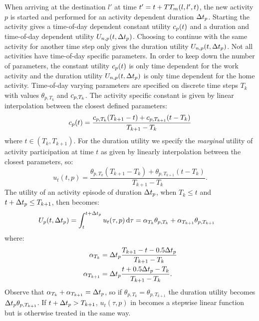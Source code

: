 When arriving at the destination $l'$ at time $t' = t+TT_m(l,l',t)$, the new activity $p$ is started and performed for an activity dependent duration $\Delta t_p$. Starting the activity gives a time-of-day dependent constant utility $c_p(t)$ and a duration and time-of-day dependent utility $U_{n,p}(t,\Delta t_p)$. Choosing to continue with the same activity for another time step only gives the duration utility $U_{n,p}(t,\Delta t_p)$. Not all activities have time-of-day specific parameters. In order to keep down the number of parameters, the constant utility $c_p(t)$ is only time dependent for the work activity and the duration utility $U_{n,p}(t,\Delta t_p)$ is only time dependent for the home activity. Time-of-day varying parameters are specified on discrete time steps $T_k$ with values $\theta_{p,T_k}$ and $c_{p,T_k}$. The activity specific constant is given by linear interpolation between the closest defined parameters:
\begin{equation*}
\ac_p(t) = \frac{\ac_{p,T_k}(T_{k+1}-t)+\ac_{p,T_{k+1}}(t-T_k)}{T_{k+1}-T_{k}}
\end{equation*}
where $t\in(T_k,T_{k+1})$. For the duration utility we specify the \emph{marginal} utility of activity participation at time $t$ as given by linearly interpolation between the closest parameters, so:
\begin{equation*}
u_t(t,p) = \frac{\theta_{p,T_k}(T_{k+1}-T_k)+\theta_{p,T_{k+1}}(t-T_k) }{T_{k+1}-T_{k}}.
\end{equation*}
The utility of an activity episode of duration $\Delta t_p$, when $T_k\leq t$ and $t+\Delta t_p\leq T_{k+1}$, then becomes:
\begin{equation} \label{eq:uacttime}
\begin{aligned}
U_p(t,\dura{p}) &= \int_t^{t+\dura{p}} u_t(\tau,p) %
\ud{\tau} = \alpha_{T_k}\theta_{p,T_k} + \alpha_{T_{k+1}}\theta_{p,T_{k+1}}%
\end{aligned}
\end{equation}
where:
\begin{align*}
\alpha_{T_k}&=\dura{p}\frac{T_{k+1} - t - 0.5 \dura{p}}{T_{k+1}-T_{k}}\\
\alpha_{T_{k+1}}&=\dura{p}\frac{t + 0.5\dura{p} - T_k}{T_{k+1}-T_{k}}.
\end{align*}
Observe that  $\alpha_{T_k} + \alpha_{T_{k+1}} = \Delta t_p$, so if $\theta_{p,T_k} = \theta_{p,T_{k+1}}$ the duration utility becomes $\Delta t_p\theta_{p,T_{k+1}}$.
If $t+\Delta t_p> T_{k+1}$, $u_t(\tau,p)$ in  becomes a stepwise linear function but is otherwise treated in the same way.

